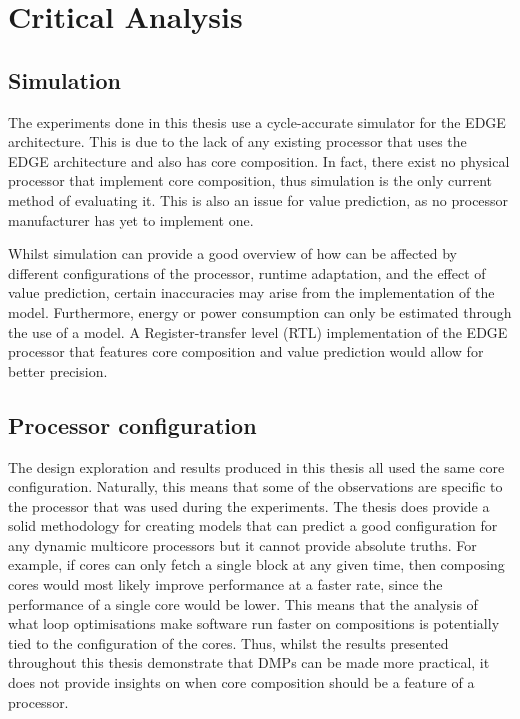 \section{Critical Analysis}

\subsection{Simulation}

The experiments done in this thesis use a cycle-accurate simulator for the EDGE architecture.
This is due to the lack of any existing processor that uses the EDGE architecture and also has core composition.
In fact, there exist no physical processor that implement core composition, thus simulation is the only current method of evaluating it.
This is also an issue for value prediction, as no processor manufacturer has yet to implement one.

Whilst simulation can provide a good overview of how can be affected by different configurations of the processor, runtime adaptation, and the effect of value prediction, certain inaccuracies may arise from the implementation of the model.
Furthermore, energy or power consumption can only be estimated through the use of a model.
A Register-transfer level (RTL) implementation of the EDGE processor that features core composition and value prediction would allow for better precision.

\subsection{Processor configuration}
The design exploration and results produced in this thesis all used the same core configuration.
Naturally, this means that some of the observations are specific to the processor that was used during the experiments.
The thesis does provide a solid methodology for creating models that can predict a good configuration for any dynamic multicore processors but it cannot provide absolute truths.
For example, if cores can only fetch a single block at any given time, then composing cores would most likely improve performance at a faster rate, since the performance of a single core would be lower.
This means that the analysis of what loop optimisations make software run faster on compositions is potentially tied to the configuration of the cores.
Thus, whilst the results presented throughout this thesis demonstrate that DMPs can be made more practical, it does not provide insights on when core composition should be a feature of a processor.

